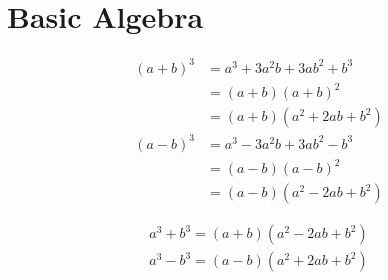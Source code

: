 \section{Basic Algebra}
\label{basic-algebra}

\begin{theorem}
    \label{co:formula-cube-sd}
    \begin{align*}
        (a + b)^3 &= a^3 + 3a^2 b + 3a b^2 + b^3 \\
                  &= ( a+b ) ( a+b )^2 \\
                  &= ( a+b ) (a^2 + 2ab + b^2) \\
        (a - b)^3 &= a^3 - 3a^2 b + 3a b^2 - b^3 \\
                  &= ( a-b ) ( a-b )^2 \\
                  &= ( a-b ) (a^2 - 2ab + b^2)
    \end{align*}
\end{theorem}

\begin{corollary}
    \label{co:formula-sd-cube}
    \begin{align*}
        a^3 + b^3 = (a + b)(a^2 - 2ab + b^2) \\
        a^3 - b^3 = (a - b)(a^2 + 2ab + b^2)
    \end{align*}
\end{corollary}
